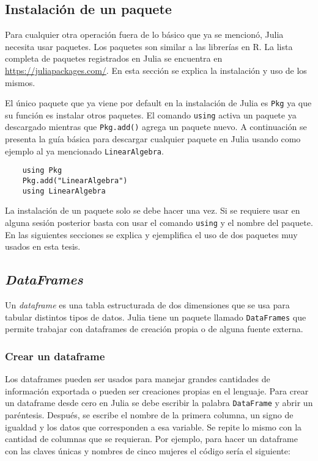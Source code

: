 \subsection{Instalación de un paquete} \label{instalacion_paquete}


Para cualquier otra operación fuera de lo básico que ya se mencionó, \textsf{Julia} necesita usar paquetes. Los paquetes son similar a las librerías en \textsf{R}. La lista completa de paquetes registrados en \textsf{Julia} se encuentra en \url{https://juliapackages.com/}. En esta sección se explica la instalación y uso de los mismos. 

El único paquete que ya viene por default en la instalación de \textsf{Julia} es \texttt{Pkg} ya que su función es instalar otros paquetes. El comando \texttt{using} activa un paquete ya descargado mientras que \texttt{Pkg.add()} agrega un paquete nuevo. A continuación se presenta la guía básica para descargar cualquier paquete en \textsf{Julia} usando como ejemplo al ya mencionado \texttt{LinearAlgebra}. 


\begin{verbatim}
	using Pkg
	Pkg.add("LinearAlgebra")
	using LinearAlgebra
\end{verbatim}

La instalación de un paquete solo se debe hacer una vez. Si se requiere usar en alguna sesión posterior basta con usar el comando \texttt{using} y el nombre del paquete. En las siguientes secciones se explica y ejemplifica el uso de dos paquetes muy usados en esta tesis. 

\subsection{\textit{DataFrames}}

Un \textit{dataframe} es una tabla estructurada de dos dimensiones que se usa para tabular distintos tipos de datos. \textsf{Julia} tiene un paquete llamado \texttt{DataFrames} que permite trabajar con dataframes de creación propia o de alguna fuente externa. 

\subsubsection{Crear un dataframe}

Los dataframes pueden ser usados para manejar grandes cantidades de información exportada o pueden ser creaciones propias en el lenguaje. Para crear un dataframe desde cero en \textsf{Julia} se debe escribir la palabra \texttt{DataFrame} y abrir un paréntesis. Después, se escribe el nombre de la primera columna, un signo de igualdad y los datos que corresponden a esa variable. Se repite lo mismo con la cantidad de columnas que se requieran. Por ejemplo, para hacer un dataframe con las claves únicas y nombres de cinco mujeres el código sería el siguiente: 


